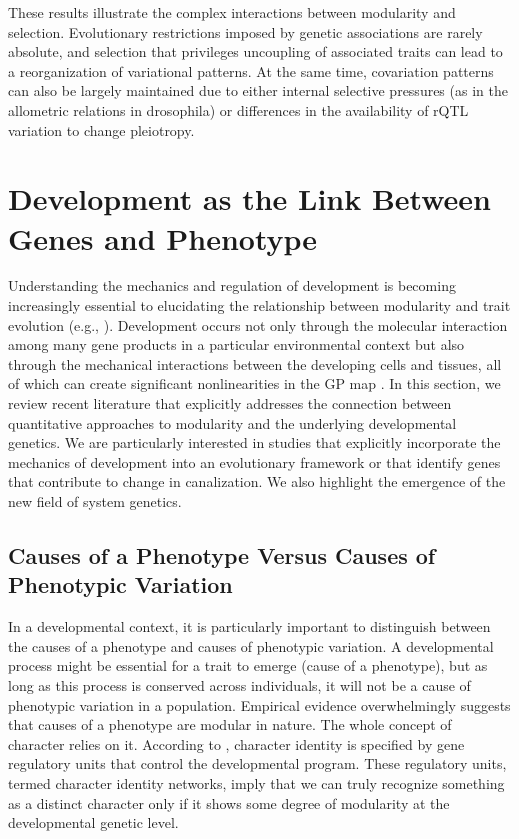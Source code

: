\begin{refsection}
These results illustrate the complex interactions between modularity and
selection. Evolutionary restrictions imposed by genetic associations are
rarely absolute, and selection that privileges uncoupling of associated
traits can lead to a reorganization of variational patterns. At the same
time, covariation patterns can also be largely maintained due to either
internal selective pressures (as in the allometric relations in
drosophila) or differences in the availability of rQTL variation to
change pleiotropy.

\section{Development as the Link Between Genes and Phenotype}

Understanding the mechanics and regulation of development is becoming
increasingly essential to elucidating the relationship between
modularity and trait evolution (e.g., \textcite{Salazar-Ciudad2010-wc}).
Development occurs not only through the molecular interaction among many
gene products in a particular environmental context but also through the
mechanical interactions between the developing cells and tissues, all of
which can create significant nonlinearities in the GP map \parencite{Alberch1991-sf, Polly2008-bb, Watson2014-pi}. 
In this section, we review recent literature that explicitly addresses the connection
between quantitative approaches to modularity and the underlying
developmental genetics. We are particularly interested in studies that
explicitly incorporate the mechanics of development into an evolutionary
framework or that identify genes that contribute to change in
canalization. We also highlight the emergence of the new field of system
genetics.

\subsection{Causes of a Phenotype Versus Causes of Phenotypic Variation}

In a developmental context, it is particularly important to distinguish
between the causes of a phenotype and causes of phenotypic variation. A
developmental process might be essential for a trait to emerge (cause of
a phenotype), but as long as this process is conserved across
individuals, it will not be a cause of phenotypic variation in a
population. Empirical evidence overwhelmingly suggests that causes of a
phenotype are modular in nature. The whole concept of character relies
on it. According to \textcite{Wagner2007-zs},
character identity is specified by gene regulatory units that control
the developmental program. These regulatory units, termed character
identity networks, imply that we can truly recognize something as a
distinct character only if it shows some degree of modularity at the
developmental genetic level.


\end{refsection}
